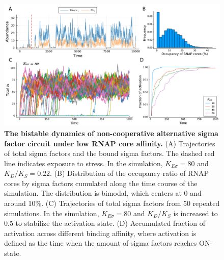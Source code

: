 \begin{figure}
    \centering
    \includegraphics[width = 6in]{strict_zero_bistability.pdf}
    \caption[
        The bistable dynamics of non-cooperative alternative sigma factor
        circuit under low RNAP core affinity
        ]{
        \textbf{The bistable dynamics of non-cooperative alternative sigma factor
        circuit under low RNAP core affinity.}
        (A) Trajectories of total sigma factors and the bound
        sigma factors. The dashed red line indicates exposure to stress.
        In the simulation, $K_{E\sigma} = 80$ and $K_D/K_S = 0.22$.
        (B) Distribution of the occupancy ratio of RNAP cores by sigma factors
        cumulated along the time course of the simulation.
        The distribution is bimodal, which centers at 0 and around 10\%.
        (C) Trajectories of total sigma factors from 50 repeated simulations.
        In the simulation, $K_{E\sigma} = 80$ and $K_D/K_S$ is increased to 0.5
        to stabilize the activation state.
        (D) Accumulated fraction of activation across different binding affinity,
        where activation is defined as the time when
        the amount of sigma factors reaches ON-state.
    }
    \label{fig:strict_zero_bistability}
\end{figure}